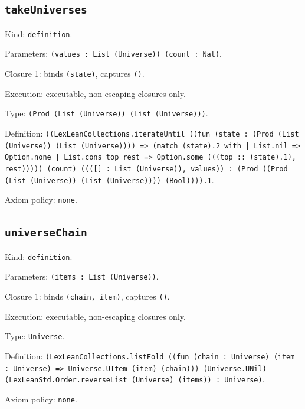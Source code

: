 \documentclass[11pt]{article}
\begin{document}
\subsection*{\texttt{takeUniverses}}
\noindent Kind: \texttt{definition}.\par
\noindent Parameters: \texttt{(values : List (Universe)) (count : Nat)}.\par
\noindent Closure 1: binds \texttt{(state)}, captures \texttt{()}.\par
\noindent Execution: executable, non-escaping closures only.\par
\noindent Type: \texttt{(Prod (List (Universe)) (List (Universe)))}.\par
\noindent Definition: \texttt{((LexLeanCollections.iterateUntil ((fun (state : (Prod (List (Universe)) (List (Universe)))) => (match (state).2 with | List.nil => Option.none | List.cons top rest => Option.some (((top :: (state).1), rest))))) (count) ((([] : List (Universe)), values)) : (Prod ((Prod (List (Universe)) (List (Universe)))) (Bool)))).1}.\par
\noindent Axiom policy: \texttt{none}.\par
\subsection*{\texttt{universeChain}}
\noindent Kind: \texttt{definition}.\par
\noindent Parameters: \texttt{(items : List (Universe))}.\par
\noindent Closure 1: binds \texttt{(chain, item)}, captures \texttt{()}.\par
\noindent Execution: executable, non-escaping closures only.\par
\noindent Type: \texttt{Universe}.\par
\noindent Definition: \texttt{(LexLeanCollections.listFold ((fun (chain : Universe) (item : Universe) => Universe.UItem (item) (chain))) (Universe.UNil) (LexLeanStd.Order.reverseList (Universe) (items)) : Universe)}.\par
\noindent Axiom policy: \texttt{none}.\par
\end{document}
